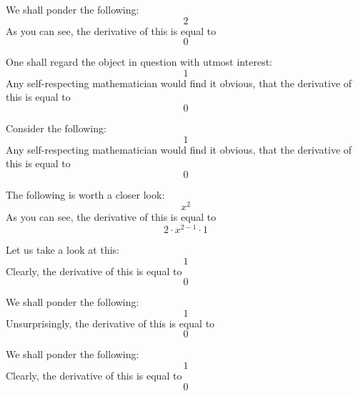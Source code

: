 \documentclass{article}
\begin{document}
We shall ponder the following:
\begin{equation}
2 
\end{equation}
As you can see, the derivative of this is equal to
\begin{equation}
0 
\end{equation}

One shall regard the object in question with utmost interest:
\begin{equation}
1 
\end{equation}
Any self-respecting mathematician would find it obvious, that the derivative of this is equal to
\begin{equation}
0 
\end{equation}

Consider the following:
\begin{equation}
1 
\end{equation}
Any self-respecting mathematician would find it obvious, that the derivative of this is equal to
\begin{equation}
0 
\end{equation}

The following is worth a closer look:
\begin{equation}
x ^{2 } 
\end{equation}
As you can see, the derivative of this is equal to
\begin{equation}
2 \cdot x ^{2 - 1 } \cdot 1 
\end{equation}

Let us take a look at this:
\begin{equation}
1 
\end{equation}
Clearly, the derivative of this is equal to
\begin{equation}
0 
\end{equation}

We shall ponder the following:
\begin{equation}
1 
\end{equation}
Unsurprisingly, the derivative of this is equal to
\begin{equation}
0 
\end{equation}

We shall ponder the following:
\begin{equation}
1 
\end{equation}
Clearly, the derivative of this is equal to
\begin{equation}
0 
\end{equation}
\end{document}

